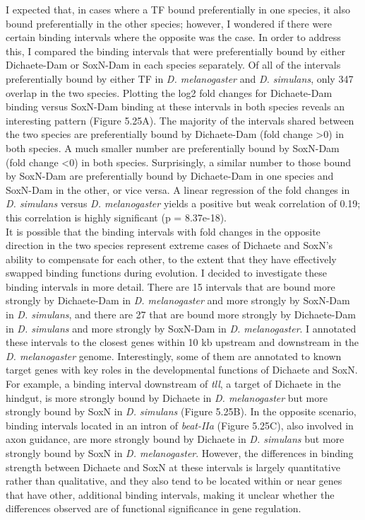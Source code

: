 I expected that, in cases where a TF bound preferentially in one species, it also bound preferentially in the other species; however, I wondered if there were certain binding intervals where the opposite was the case. In order to address this, I compared the binding intervals that were preferentially bound by either Dichaete-Dam or SoxN-Dam in each species separately. Of all of the intervals preferentially bound by either TF in \emph{D. melanogaster} and \emph{D. simulans}, only 347 overlap in the two species. Plotting the log2 fold changes for Dichaete-Dam binding versus SoxN-Dam binding at these intervals in both species reveals an interesting pattern (Figure 5.25A). The majority of the intervals shared between the two species are preferentially bound by Dichaete-Dam (fold change \textgreater 0) in both species. A much smaller number are preferentially bound by SoxN-Dam (fold change \textless 0) in both species. Surprisingly, a similar number to those bound by SoxN-Dam are preferentially bound by Dichaete-Dam in one species and SoxN-Dam in the other, or vice versa. A linear regression of the fold changes in \emph{D. simulans} versus \emph{D. melanogaster} yields a positive but weak correlation of 0.19; this correlation is highly significant (p = 8.37e-18).\\

It is possible that the binding intervals with fold changes in the opposite direction in the two species represent extreme cases of Dichaete and SoxN's ability to compensate for each other, to the extent that they have effectively swapped binding functions during evolution. I decided to investigate these binding intervals in more detail. There are 15 intervals that are bound more strongly by Dichaete-Dam in \emph{D. melanogaster} and more strongly by SoxN-Dam in \emph{D. simulans}, and there are 27 that are bound more strongly by Dichaete-Dam in \emph{D. simulans} and more strongly by SoxN-Dam in \emph{D. melanogaster}. I annotated these intervals to the closest genes within 10 kb upstream and downstream in the \emph{D. melanogaster} genome. Interestingly, some of them are annotated to known target genes with key roles in the developmental functions of Dichaete and SoxN. For example, a binding interval downstream of \emph{tll}, a target of Dichaete in the hindgut, is more strongly bound by Dichaete in \emph{D. melanogaster} but more strongly bound by SoxN in \emph{D. simulans} (Figure 5.25B). In the opposite scenario, binding intervals located in an intron of \emph{beat-IIa} (Figure 5.25C), also involved in axon guidance, are more strongly bound by Dichaete in \emph{D. simulans} but more strongly bound by SoxN in \emph{D. melanogaster}. However, the differences in binding strength between Dichaete and SoxN at these intervals is largely quantitative rather than qualitative, and they also tend to be located within or near genes that have other, additional binding intervals, making it unclear whether the differences observed are of functional significance in gene regulation.\\

